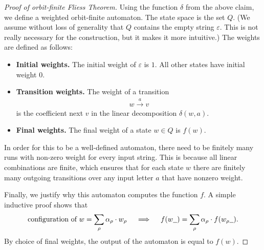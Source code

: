\begin{proof}[Proof of orbit-finite Fliess Theorem]
    Using the function $\delta$ from the above claim, we define a weighted orbit-finite automaton. The state space is the set $Q$. (We assume without loss of generality that $Q$ contains the empty string $\varepsilon$. This is not really necessary for the construction, but it makes it more intuitive.) The weights are defined as follows: 
    \begin{itemize}
        \item \textbf{Initial weights.} The initial weight of   $\varepsilon$ is $1$. All other states have initial weight $0$.
        \item \textbf{Transition weights.} The weight of a transition 
        \begin{align*}
        w \xrightarrow{a} v
        \end{align*}
    is the coefficient next $v$ in the linear decomposition $\delta(w,a)$.
        \item \textbf{Final weights.} The final weight of a state $w \in Q$ is $f(w)$.
    \end{itemize}
    In order for this to be a well-defined automaton, there need to be  finitely many runs with non-zero weight for every input string. This is because all linear combinations are finite, which ensures that for each state $w$ there are finitely many outgoing transitions over any input letter $a$ that have nonzero weight.

    Finally, we justify why this automaton computes the function $f$.   A simple inductive proof shows that  
    \begin{align*}
\text{configuration of $w$} = \sum_\rho \alpha_\rho \cdot w_\rho
\quad \implies \quad 
        f(w\underline{\hspace{2mm}}) = 
    \sum_\rho \alpha_\rho \cdot f(w_\rho\underline{\hspace{2mm}}).
    \end{align*}
    By choice of final weights,  the output of the automaton is equal to $f(w)$. 
\end{proof}


